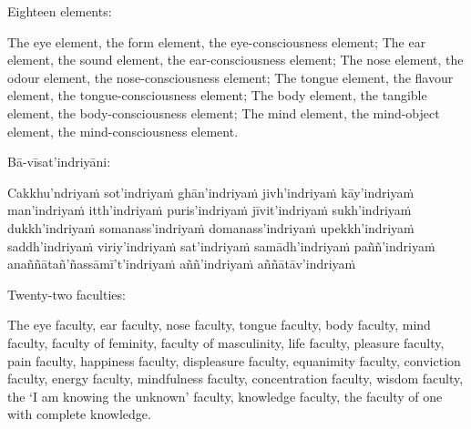 \begin{english-verses}
  Eighteen elements:
  \begin{english-hangtogether-verses}
    The eye element, the form element, the eye-consciousness element; The ear element, the sound element, the ear-consciousness element; The nose element, the odour element, the nose-consciousness element; The tongue element, the flavour element, the tongue-consciousness element; The body element, the tangible element, the body-consciousness element; The mind element, the mind-object element, the mind-consciousness element.
  \end{english-hangtogether-verses}
\end{english-verses}

\suttaRef{[MN 115]}

\begin{pali-hang-continued}
  Bā-vīsat'indriyāni:\makeatletter\hyperlink{endnote131-appendix}\makeatother
  \begin{pali-hang}
    Cakkhu'ndriyaṁ sot'indriyaṁ ghān'indriyaṁ jivh'indriyaṁ kāy'indriyaṁ man'indriyaṁ itth'indriyaṁ puris'indriyaṁ jīvit'indriyaṁ sukh'indriyaṁ dukkh'indriyaṁ somanass'indriyaṁ domanass'indriyaṁ upekkh'indriyaṁ saddh'indriyaṁ viriy'indriyaṁ sat'indriyaṁ samādh'indriyaṁ paññ'indriyaṁ anaññātañ'ñassāmī't'indriyaṁ aññ'indriyaṁ aññātāv'indriyaṁ
  \end{pali-hang}
\end{pali-hang-continued}

\begin{english-verses}
  Twenty-two faculties:
  \begin{english-hangtogether-verses}
    The eye faculty, ear faculty, nose faculty, tongue faculty, body faculty, mind faculty, faculty of feminity, faculty of masculinity, life faculty, pleasure faculty, pain faculty, happiness faculty, displeasure faculty, equanimity faculty, conviction faculty, energy faculty, mindfulness faculty, concentration faculty, wisdom faculty, the `I am knowing the unknown' faculty, knowledge faculty, the faculty of one with complete knowledge.
  \end{english-hangtogether-verses}
\end{english-verses}

\suttaRef{[Vibh]}

